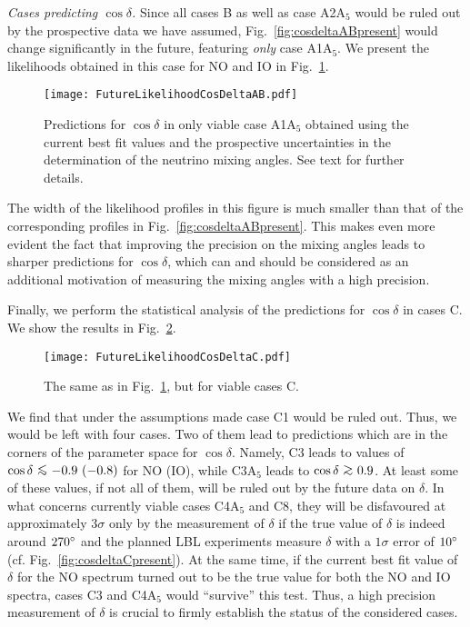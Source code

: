 \documentclass[11pt,a4paper]{article}
\def\gtap{\ \raisebox{-.4ex}{\rlap{$\sim$}} \raisebox{.4ex}{$>$}\ }
\def\ltap{\ \raisebox{-.4ex}{\rlap{$\sim$}} \raisebox{.4ex}{$<$}\ }
\numberwithin{equation}{section}
\begin{document}
 \textit{Cases predicting $\cos\delta$.} 
Since all cases B as well as case A2A$_5$ would be ruled out by the prospective 
data we have assumed, 
Fig.~\ref{fig:cosdeltaABpresent} would change significantly in the future, 
featuring \textit{only} case A1A$_5$. 
We present the likelihoods obtained in this case for NO and IO 
in Fig.~\ref{fig:cosdeltaABfuture}.
\begin{figure}
\centering
\texttt{[image: FutureLikelihoodCosDeltaAB.pdf]}
\caption{Predictions for $\cos\delta$ in only viable case A1A$_5$
obtained using 
the current best fit values and the prospective uncertainties in the determination 
of the neutrino mixing angles. 
See text for further details.}
\label{fig:cosdeltaABfuture}
\end{figure}
%
The width of the likelihood profiles in this figure is much smaller than 
that of the corresponding profiles in Fig.~\ref{fig:cosdeltaABpresent}. 
This makes even more evident the fact that improving the precision on 
the mixing angles leads to sharper predictions for $\cos\delta$,  
which can and should be considered as an additional motivation of 
measuring the mixing angles with a high precision.

 Finally, we perform the statistical analysis of the predictions 
for $\cos\delta$ in cases C. 
We show the results in Fig.~\ref{fig:cosdeltaCfuture}.
\begin{figure}[t!]
\centering
\texttt{[image: FutureLikelihoodCosDeltaC.pdf]}
\caption{The same as in Fig.~\ref{fig:cosdeltaABfuture}, but for viable cases C.}
\label{fig:cosdeltaCfuture}
\end{figure}
%
We find that under the assumptions made case C1 would be ruled out.
Thus, we would be left with four cases.
Two of them lead to predictions 
which are in the corners of the parameter space for $\cos\delta$. 
Namely, C3 leads to values of $\cos\delta \ltap {-0.9}~(-0.8)$ for NO (IO), 
while C3A$_5$ leads to $\cos\delta \gtap 0.9$. 
At least some of these values, if not all of them, 
will be ruled out by the future data on $\delta$.
In what concerns currently viable cases  C4A$_5$ and C8,
they will be disfavoured at approximately $3\sigma$ only by 
the measurement of $\delta$ if the true value of 
$\delta$ is indeed around $270\degree$ 
and the planned LBL experiments measure 
$\delta$ with a $1\sigma$ error of $10\degree$ 
(cf. Fig.~\ref{fig:cosdeltaCpresent}). 
At the same time, if the current best fit value of $\delta$ for 
the NO spectrum turned out to be the true value for both 
the NO and IO spectra, cases C3 and C4A$_5$ would ``survive'' this test.
Thus, a high precision measurement of $\delta$ is crucial to 
firmly establish the status of the considered cases.
\end{document}
